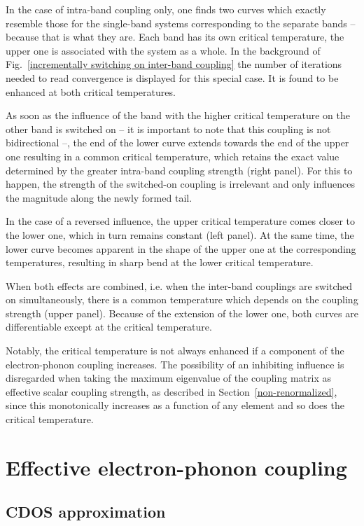 In the case of intra-band coupling only, one finds two curves which exactly
resemble those for the single-band systems corresponding to the separate bands
-- because that is what they are. Each band has its own critical temperature,
the upper one is associated with the system as a whole. In the background of
Fig.~\ref{incrementally switching on inter-band coupling} the number of
iterations needed to read convergence is displayed for this special case. It is
found to be enhanced at both critical temperatures.

As soon as the influence of the band with the higher critical temperature on the
other band is switched on -- it is important to note that this coupling is not
bidirectional --, the end of the lower curve extends towards the end of the
upper one resulting in a common critical temperature, which retains the exact
value determined by the greater intra-band coupling strength (right panel). For
this to happen, the strength of the switched-on coupling is irrelevant and only
influences the magnitude along the newly formed tail.

In the case of a reversed influence, the upper critical temperature comes closer
to the lower one, which in turn remains constant (left panel). At the same time,
the lower curve becomes apparent in the shape of the upper one at the
corresponding temperatures, resulting in sharp bend at the lower critical
temperature.

When both effects are combined, i.e. when the inter-band couplings are switched
on simultaneously, there is a common temperature which depends on the coupling
strength (upper panel). Because of the extension of the lower one, both curves
are differentiable except at the critical temperature.

Notably, the critical temperature is not always enhanced if a component of the
electron-phonon coupling increases. The possibility of an inhibiting influence
is disregarded when taking the maximum eigenvalue of the coupling matrix as
effective scalar coupling strength, as described in
Section~\ref{non-renormalized}, since this monotonically increases as a function
of any element and so does the critical temperature.

\section{Effective electron-phonon coupling}

\subsection{CDOS approximation}

